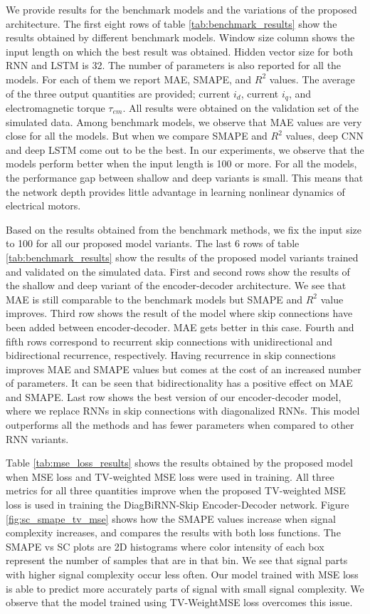 \documentclass[letterpaper]{article}
\begin{document}
We provide results for the benchmark models and the variations of the proposed architecture. The first eight rows of table \ref{tab:benchmark_results} show the results obtained by different benchmark models. Window size column shows the input length on which the best result was obtained. Hidden vector size for both RNN and LSTM is 32. The number of parameters is also reported for all the models. For each of them we report MAE, SMAPE, and $R^2$ values. The average of the three output quantities are provided; current $i_d$, current $i_q$, and electromagnetic torque $\tau_{em}$. All results were obtained on the validation set of the simulated data. Among benchmark models, we observe that MAE values are very close for all the models. But when we compare SMAPE and $R^2$ values, deep CNN and deep LSTM come out to be the best. In our experiments, we observe that the models perform better when the input length is 100 or more. For all the models, the performance gap between shallow and deep variants is small. This means that the network depth provides little advantage in learning nonlinear dynamics of electrical motors.

Based on the results obtained from the benchmark methods, we fix the input size to 100 for all our proposed model variants. The last 6 rows of table \ref{tab:benchmark_results} show the results of the proposed model variants trained and validated on the simulated data. First and second rows show the results of the shallow and deep variant of the encoder-decoder architecture. We see that MAE is still comparable to the benchmark models but SMAPE and $R^2$ value improves. Third row shows the result of the model where skip connections have been added between encoder-decoder. MAE gets better in this case. Fourth and fifth rows correspond to recurrent skip connections with unidirectional and bidirectional recurrence, respectively. Having recurrence in skip connections improves MAE and SMAPE values but comes at the cost of an increased number of parameters. It can be seen that bidirectionality has a positive effect on MAE and SMAPE. Last row shows the best version of our encoder-decoder model, where we replace RNNs in skip connections with diagonalized RNNs. This model outperforms all the methods and has fewer parameters when compared to other RNN variants.

Table \ref{tab:mse_loss_results} shows the results obtained by the proposed model when MSE loss and TV-weighted MSE loss were used in training. All three metrics for all three quantities improve when the proposed TV-weighted MSE loss is used in training the DiagBiRNN-Skip Encoder-Decoder network. Figure \ref{fig:sc_smape_tv_mse} shows how the SMAPE values increase when signal complexity increases, and compares the results with both loss functions. The SMAPE vs SC plots are 2D histograms where color intensity of each box represent the number of samples that are in that bin. We see that signal parts with higher signal complexity occur less often. Our model trained with MSE loss is able to predict more accurately parts of signal with small signal complexity. We observe that the model trained using TV-WeightMSE loss overcomes this issue.
\end{document}
